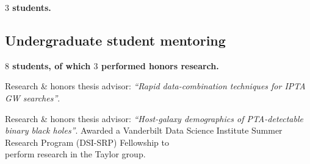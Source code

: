 \documentclass[11pt,letterpaper,sans]{moderncv}
\begin{document}
\textbf{$3$ students.} \vspace{0.2cm}




\subsection{Undergraduate student mentoring}

\textbf{$8$ students, of which $3$ performed honors research.} \vspace{0.2cm}


\vspace{-0.1cm}
\hspace{0.71cm} Research \& honors thesis advisor: \textit{``Rapid data-combination techniques for IPTA GW searches''}.%

\vspace{-0.1cm}
\hspace{0.71cm} Research \& honors thesis advisor: \textit{``Host-galaxy demographics of PTA-detectable binary black holes''}.
\vspace{-0.1cm}
\hspace{0.8cm}Awarded a Vanderbilt Data Science Institute Summer Research Program (DSI-SRP) Fellowship to \\
\vspace{-0.1cm}
\hspace{0.71cm}perform research in the Taylor group.\vspace{0.1cm}
\end{document}
